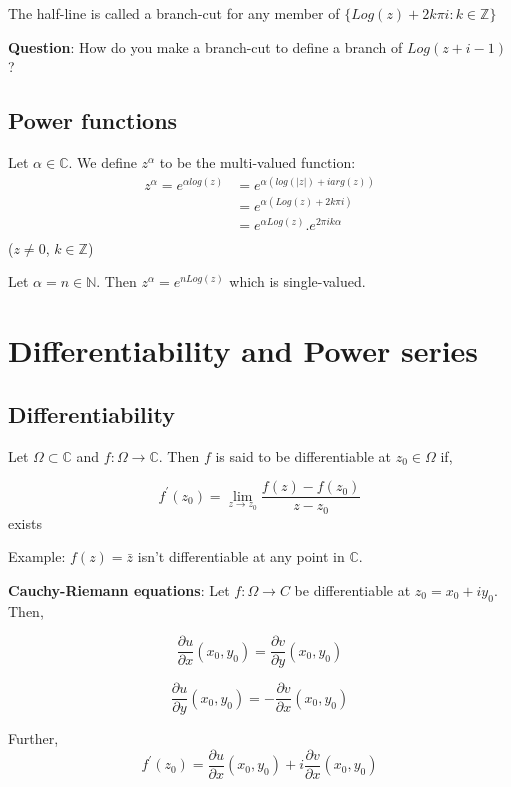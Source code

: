 \documentclass{article}
\begin{document}
\begin{flushleft}
The half-line is called a branch-cut for any member of $\{Log(z)+2k\pi i: k\in \mathds{Z}\}$

\textbf{Question}: How do you make a branch-cut to define a branch of $Log(z+i-1)$?

\subsection{\textbf{Power functions}}

Let $\alpha \in \mathds{C}$. We define $z^{\alpha}$ to be the multi-valued function:
\[
    \begin{split} 
z^{\alpha}=e^{\alpha log(z)}&= e^{\alpha(log(|z|)+ iarg(z))}\\
&= e^{\alpha(Log(z)+2k\pi i)}\\
&=e^{\alpha Log(z)}.e^{2\pi ik\alpha} \\
    \end{split}
    \]
  ($z\neq 0$, $k\in \mathds{Z}$)

Let $\alpha=n \in \mathds{N}$. Then $z^{\alpha}=e^{nLog(z)}$ which is single-valued.

\clearpage

\section{Differentiability and Power series}

\subsection{\textbf{Differentiability}} 

Let $\Omega \subset \mathds{C}$ and $f: \Omega \rightarrow \mathds{C}$. Then $f$ is said to be differentiable at $z_0\in \Omega$ if,

$$f^{'}(z_0)= \lim_{z \to z_0} \frac{f(z)-f(z_0)}{z-z_0}$$ exists 

Example: $f(z)=\bar{z}$ isn't differentiable at any point in $\mathds{C}$.

\textbf{Cauchy-Riemann equations}: Let $f:\Omega \rightarrow C$ be differentiable at $z_0=x_0+iy_0$. Then,

$$\frac{\partial u}{\partial x}(x_0,y_0)=\frac{\partial v}{\partial y}(x_0,y_0)$$

$$\frac{\partial u}{\partial y}(x_0,y_0)= -\frac{\partial v}{\partial x}(x_0,y_0)$$

Further, $$f^{'}(z_0)= \frac{\partial u}{\partial x}(x_0,y_0)+i\frac{\partial v}{\partial x}(x_0,y_0)$$


\end{flushleft}
\end{document}
